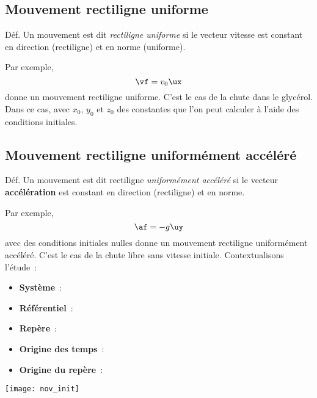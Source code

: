 \documentclass[../main/main.tex]{subfiles}
\begin{document}
\subsection{Mouvement rectiligne uniforme}
\begin{rdefi}{Déf.}
    Un mouvement est dit \textit{rectiligne uniforme} si le vecteur vitesse est
    constant en direction (rectiligne) et en norme (uniforme).
\end{rdefi}
Par exemple,
\[\vf = v_0\ux\]
donne un mouvement rectiligne uniforme. C'est le cas de la chute dans le
glycérol. Dans ce cas,
avec $x_0$, $y_0$ et $z_0$ des constantes que l'on peut calculer à l'aide des
conditions initiales.

\subsection{Mouvement rectiligne uniformément accéléré}
\begin{rdefi}{Déf.}
    Un mouvement est dit rectiligne \textit{uniformément accéléré} si le vecteur
    \textbf{accélération} est constant en direction (rectiligne) et en norme.
\end{rdefi}
Par exemple,
\[\af = -g\uy\]
avec des conditions initiales nulles donne un mouvement rectiligne uniformément
accéléré. C'est le cas de la chute libre sans vitesse initiale. Contextualisons
l'étude~: \smallbreak
\begin{minipage}{0.80\linewidth}
    \begin{itemize}
        \item \textbf{Système}~:
        \item \textbf{Référentiel}~:
        \item \textbf{Repère}~:
        \item \textbf{Origine des temps}~:
        \item \textbf{Origine du repère}~:
    \end{itemize}
\end{minipage}
\hfill
\begin{minipage}{0.19\linewidth}
    \begin{center}
        \texttt{[image: nov\_init]}
    \end{center}
\end{minipage}
\end{document}

